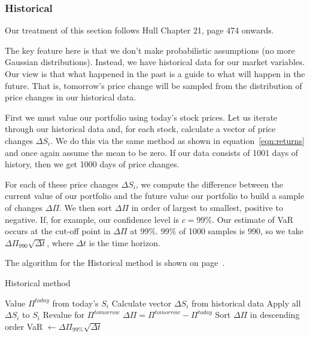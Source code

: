 \documentclass[../Dissertation.tex]{subfiles}
\begin{document}
\subsubsection{Historical}
\label{section:historical}

Our treatment of this section follows Hull \cite{Hull:2012} Chapter 21, page 474 onwards.

The key feature here is that we don't make probabilistic assumptions (no more Gaussian distributions). 
Instead, we have historical data for our market variables. 
Our view is that what happened in the past is a guide to what will happen in the future.
That is, tomorrow's price change will be sampled from the distribution of price changes in our historical data.

First we must value our portfolio using today's stock prices.
Let us iterate through our historical data and, for each stock, calculate a vector of price changes $\Delta S_i$.
We do this via the same method as shown in equation~\ref{eqn:returns} and once again assume the mean to be zero.
If our data consists of 1001 days of history, then we get 1000 days of price changes.

For each of these price changes $\Delta S_i$, we compute the difference between the current value of our portfolio and the future value our portfolio to build a sample of changes $\Delta\Pi$.
We then sort $\Delta\Pi$ in order of largest to smallest, positive to negative.
If, for example, our confidence level is $c=99\%$.
Our estimate of VaR occurs at the cut-off point in $\Delta\Pi$ at 99\%.
99\% of 1000 samples is 990, so we take $\Delta\Pi_{990}\sqrt{\Delta t}$, where $\Delta t$ is the time horizon.

The algorithm for the Historical method is shown on page~\pageref{alg:historical}.
					\begin{algorithm}
						\caption{Historical method}
						\begin{algorithmic}[1]
							\label{alg:historical}							
							\State Value $\Pi^{today}$ from today's $S_i$
							\State Calculate vector $\Delta S_i$ from historical data
							\State Apply all $\Delta S_i$ to $S_i$
							\EndFor
							\State Revalue for $\Pi^{tomorrow}$
							\State $\Delta\Pi = \Pi^{tomorrow}-\Pi^{today}$
							\State Sort $\Delta\Pi$ in descending order
							\State VaR $\gets \Delta\Pi_{99\%}\sqrt{\Delta t}$
						\EndProcedure
						\end{algorithmic}
					\end{algorithm}	
\end{document}
